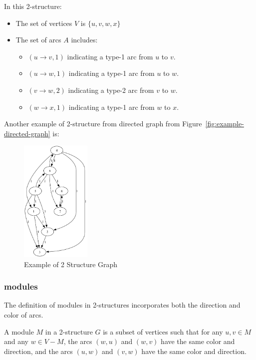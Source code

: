 In this 2-structure:
\begin{itemize}
    \item The set of vertices $V$ is $\{u, v, w, x\}$
    \item The set of arcs $A$ includes:
    \begin{itemize}
        \item $(u \rightarrow v, 1)$ indicating a type-1 arc from $u$ to $v$.
        \item $(u \rightarrow w, 1)$ indicating a type-1 arc from $u$ to $w$.
        \item $(v \rightarrow w, 2)$ indicating a type-2 arc from $v$ to $w$.
        \item $(w \rightarrow x, 1)$ indicating a type-1 arc from $w$ to $x$.
    \end{itemize}
\end{itemize}

Another example of 2-structure from directed graph from Figure~\ref{fig:example-directed-graph} is:

\begin{figure}[!h]
    \centering
    \includegraphics[width=0.30\textwidth]{images/graphs/digraph_ex1}
    \caption{Example of 2 Structure Graph}
    \label{fig:2-structure-graph-example}
\end{figure}

\subsubsection{modules}

The definition of modules in 2-structures incorporates both the direction and color of arcs.

\begin{mydef}
    A module $M$ in a 2-structure $G$ is a subset of vertices such that for any $u, v \in M$ and any $w \in V - M$, the arcs $(w, u)$ and $(w, v)$ have the same color and direction, and the arcs $(u, w)$ and $(v, w)$ have the same color and direction.
\end{mydef}


